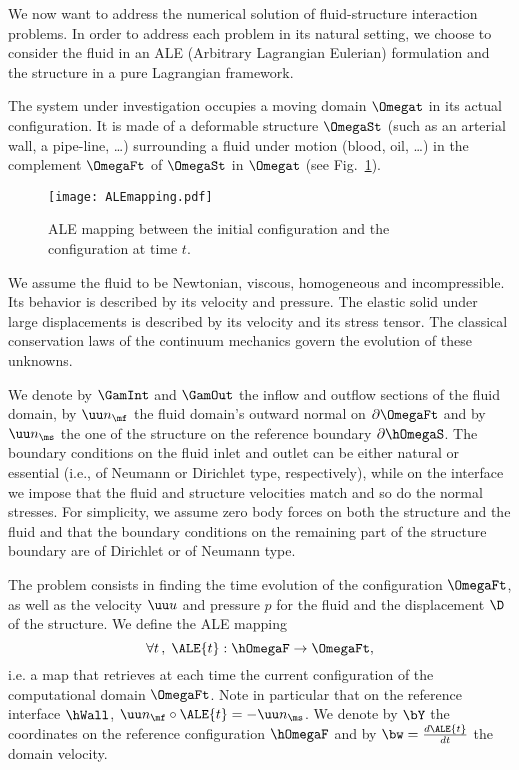 We now want to address the numerical solution of fluid-structure interaction problems.
In order to address each problem in its natural setting, we
choose to consider the fluid in an ALE (Arbitrary Lagrangian
Eulerian) formulation and the structure in a pure Lagrangian framework.



The system under investigation occupies a moving domain $\Omegat$
in its actual configuration. It is made of a deformable structure
$\OmegaSt$ (such as an arterial wall, a pipe-line, \ldots)
surrounding a fluid under motion (blood, oil, \ldots) in  the
complement $\OmegaFt$ of  $\OmegaSt$ in $\Omegat$ (see
Fig.~\ref{fig:ALEmapping}).

\begin{figure}[!h]
\begin{center}
\texttt{[image: ALEmapping.pdf]}
\end{center}
\caption{ALE mapping between the initial configuration and the
configuration at time $t$.}\label{fig:ALEmapping}
\end{figure}

We assume the fluid to be Newtonian, viscous, homogeneous and
incompressible. Its behavior is described by its velocity and
pressure. The elastic solid under large displacements is
described by its velocity and its stress tensor. The classical
conservation laws of the continuum mechanics govern the evolution
of these unknowns.

We denote by $\GamInt$ and $\GamOut$ the inflow and outflow
sections of the fluid domain, by $\uu n_\mf$ the  fluid domain's
outward normal on $\partial \OmegaFt$ and by $\uu n_\ms$ the one
of the structure on the reference boundary $\partial \hOmegaS$.
The boundary conditions on the fluid inlet and outlet can be
either natural or essential (i.e., of Neumann or Dirichlet type,
respectively), while on the interface we impose that the fluid
and structure velocities match and so do the normal stresses. For
simplicity, we assume zero body forces on both the structure and
the fluid and that the boundary conditions on the remaining part
of the structure boundary are of Dirichlet or of Neumann type.

The problem consists in finding the time evolution of the
configuration $\OmegaFt$, as well as the velocity $\uu u$ and
pressure $p$ for the fluid and the displacement $\D$ of
the structure. We define the ALE mapping
\begin{equation*}
 \forall t \,,\;  \ALE{t} : \hOmegaF \rightarrow \OmegaFt,
\end{equation*}
i.e. a map that retrieves at each time the current configuration
of the computational domain $\OmegaFt$. Note in particular that on
the reference interface $\hWall$, $\uu n_\mf \circ \ALE{t} = -\uu
n_\ms$. We denote by $\bY$ the coordinates on the reference
configuration $\hOmegaF$ and by $\bw=\frac{d \ALE{t}}{dt}$ the
domain velocity.

